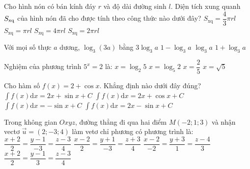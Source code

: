 \begin{ex}%
{
}
\end{ex}
\begin{ex}%
Cho hình nón có bán kính đáy $r$ và độ dài đường sinh $l$. Diện tích xung quanh $S_{\rm x q}$ của hình nón đã cho được tính theo công thức nào dưới đây?
\choice
{$S_{\mathrm{xq}}=\dfrac{4}{3} \pi r l$}
{\True $S_{\mathrm{xq}}=\pi r l$}
{$S_{\mathrm{xq}}=4\pi r l$}
{$S_{\mathrm{xq}}=2\pi r l$}

\end{ex}
\begin{ex}%
Với mọi số thực $a$ dương, $\log_3(3 a)$ bằng
\choice
{$3\log_3 a$}
{$1-\log_3 a$}
{$\log_3 a$}
{\True $1+\log_3 a$}

\end{ex}
\begin{ex}%
Nghiệm của phương trình $5^{x}=2$ là:
\choice
{$x=\log_2 5$}
{\True $x=\log_5 2$}
{$x=\dfrac{2}{5}$}
{$x=\sqrt{5}$}

\end{ex}
\begin{ex}%
Cho hàm số $f(x)=2+\cos x$. Khẳng định nào dưới đây đúng?
\choice
{\True $\displaystyle\int f(x) \mathrm{d} x=2 x+\sin x+C$}
{$\displaystyle\int f(x) \mathrm{d} x=2 x+\cos x+C$}
{$\displaystyle\int f(x) \mathrm{d} x=-\sin x+C$}
{$\displaystyle\int f(x) \mathrm{d} x=2 x-\sin x+C$}

\end{ex}
\begin{ex}%
Trong không gian $O x y z$, đường thẳng đi qua hai điểm $M(-2; 1; 3)$ và nhận vectơ $\vec{u}=(2;-3; 4)$ làm vetơ chỉ phương có phương trình là:
\choice
{\True $\dfrac{x+2}{2}=\dfrac{y-1}{-3}=\dfrac{z-3}{4}$}
{$\dfrac{x-2}{2}=\dfrac{y+1}{-3}=\dfrac{z+3}{4}$}
{$\dfrac{x-2}{-2}=\dfrac{y+3}{1}=\dfrac{z-4}{3}$}
{$\dfrac{x+2}{2}=\dfrac{y-1}{3}=\dfrac{z-3}{4}$}

\end{ex}
